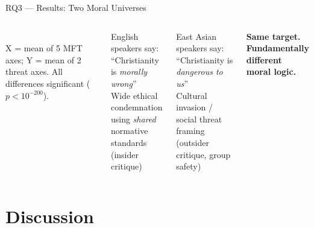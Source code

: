 \documentclass[aspectratio=169,10pt]{beamer}
\begin{document}
\begin{frame}{RQ3 --- Results: Two Moral Universes}
\begin{columns}[T]
\\
      {\tiny X = mean of 5 MFT axes; Y = mean of 2 threat axes.
             All differences significant ($p < 10^{-200}$).}
      \vspace{6pt}
      \begin{block}{English speakers say:}
        \small ``Christianity is \emph{morally wrong}''\\[4pt]
        Wide ethical condemnation\\
        using \emph{shared} normative standards\\
        (insider critique)
      \end{block}
      \vspace{6pt}
      \begin{alertblock}{East Asian speakers say:}
        \small ``Christianity is \emph{dangerous to us}''\\[4pt]
        Cultural invasion /\\
        social threat framing\\
        (outsider critique, group safety)
      \end{alertblock}
      \vspace{6pt}
      \textbf{\small Same target.\\Fundamentally different moral logic.}
  \end{columns}
\end{frame}

\section{Discussion}
\end{document}

